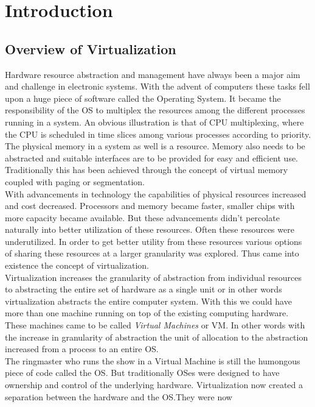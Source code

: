 
\chapter{Introduction} \label{introduction}

\section{Overview of Virtualization}
Hardware resource abstraction and management have always been a major aim and challenge in
electronic systems. With the advent of computers these tasks fell upon a huge piece of software
called the Operating System. It became the responsibility of the OS to multiplex the resources
among the different processes running in a system. An obvious illustration is that of CPU
multiplexing, where the CPU is scheduled in time slices among various processes according to
priority. The physical memory in a system as well is a resource. Memory also needs to be
abstracted and suitable interfaces are to be provided for easy and efficient use. Traditionally
this has been achieved through the concept of virtual memory coupled with paging or segmentation.
\\
With advancements in technology the capabilities of physical resources increased and cost
decreased. Processors and memory became faster, smaller chips with more capacity became available.
But these advancements didn't percolate naturally into better utilization of these resources.
Often these resources were underutilized. In order to get better utility from these resources
various options of sharing these resources at a larger granularity was explored. Thus came into
existence the concept of virtualization.\\
Virtualization increases the granularity of abstraction from individual resources to abstracting
the entire set of hardware as a single unit or in other words virtualization abstracts the entire
computer system. With this we could have more than one machine running on top of the existing
computing hardware. These machines came to be called \textit{Virtual Machines} or VM. In other
words with the increase in granularity of abstraction the unit of allocation to the abstraction
increased from a process to an entire OS.\\
The ringmaster who runs the show in a Virtual Machine is still the humongous piece of code called
the OS. But traditionally OSes were designed to have ownership and control of the underlying
hardware. Virtualization now created a separation between the hardware and the OS.They were now

